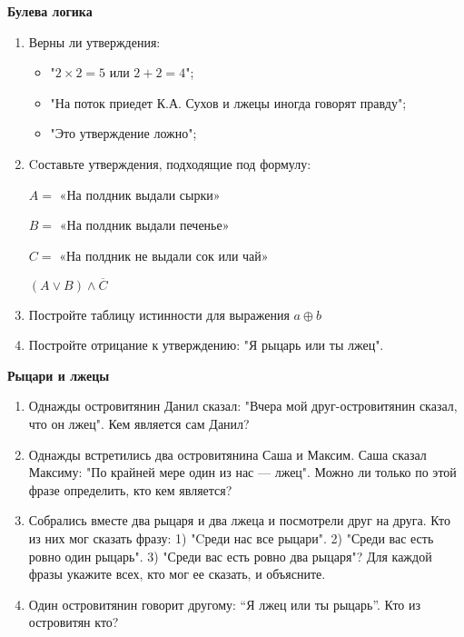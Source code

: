 \documentclass{article}
\begin{document}
\begin{center}
	\textbf{Булева логика}
\end{center}

\begin{enumerate}[label*=\protect\fbox{\arabic{enumi}}]
	
	\item Верны ли утверждения:
	\begin{itemize}
		\item "$2 \times 2 = 5$ или $2 + 2 = 4$";
		
		\item "На поток приедет К.А. Сухов и лжецы иногда говорят правду";
		
		\item "Это утверждение ложно";
	\end{itemize}
	
	\item Cоставьте утверждения, подходящие под формулу:
	
	$A =$ «На полдник выдали сырки»
	
	$B =$ «На полдник выдали печенье»
	
	$C =$ «На полдник не выдали сок или чай» 
	
	$(A\vee B)\wedge \overline{C}$
	
	
	\item Постройте таблицу истинности для выражения $a \oplus b$
	
	\item Постройте отрицание к утверждению: "Я рыцарь или ты лжец".
	
\end{enumerate}


\begin{center}
	\textbf{Рыцари и лжецы}
\end{center}

\begin{enumerate}[label*=\protect\fbox{\arabic{enumi}}]
	
	\item Однажды островитянин Данил сказал: "Вчера мой друг-островитянин сказал, что он лжец". Кем является сам Данил?
	
	\item Однажды встретились два островитянина Саша и Максим. Саша сказал Максиму: "По крайней мере один из нас — лжец". Можно ли только по этой фразе определить, кто кем является?
	
	\item Собрались вместе два рыцаря и два лжеца и посмотрели друг на друга. Кто из них мог сказать фразу: 1) "Cреди нас все рыцари". 2) "Среди вас есть ровно один рыцарь". 3) "Среди вас есть ровно два рыцаря"? Для каждой фразы укажите всех, кто мог ее сказать, и объясните.
	
	\item Один островитянин говорит другому: “Я лжец или ты рыцарь”. Кто из островитян кто?
	
\end{enumerate}
\end{document}
